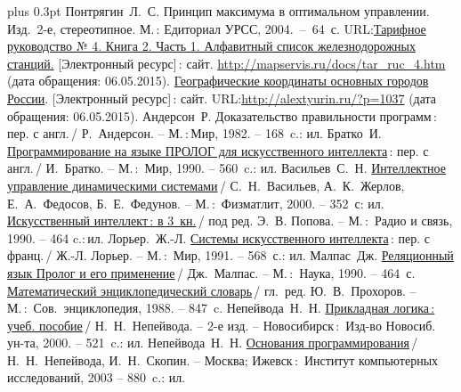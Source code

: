 \documentclass[a4paper,14pt, openany, twoside, final]{extbook} %
\def\emphbib#1{#1}
\begin{document}
\begin{thebibliography}{99}\itemsep1pt \parskip 0pt plus 0.3pt
 Понтрягин~Л.~С. Принцип максимума в оптимальном управлении. Изд.~2-е, стереотипное. М.\,: Едиториал УРСС,  2004.~--~64~с.
 URL:\href{http://mapservis.ru/docs/tar_ruc_4.htm}{Тарифное руководство № 4. Книга 2. Часть 1. Алфавитный список железнодорожных станций.} [Электронный ресурс]\,{}: сайт. \url{http://mapservis.ru/docs/tar_ruc_4.htm} (дата обращения: 06.05.2015).
 \href{http://alextyurin.ru/?p=1037}{Географические координаты основных городов России}. [Электронный ресурс]\,{}: сайт. URL:\url{http://alextyurin.ru/?p=1037} (дата обращения: 06.05.2015).
 Андерсон~Р. \emphbib{Доказательство правильности программ}\,{}: пер. с англ.\,{}/ Р.~Андерсон. -- М.\,:\,Мир, 1982. -- 168~c.: ил.
 Братко~И. \emphbib{\href{http://royallib.ru/book/bratko_ivan/programmirovanie_na_yazike_prolog_dlya_iskusstvennogo_intellekta.html}{Программирование на языке ПРОЛОГ для искусственного интеллекта}}\,{}: пер. с англ.\,/ И.~Братко. -- М.\,:~Мир, 1990. -- 560~c.: ил.
 Васильев~С.~Н. \emphbib{\href{http://bookfi.org/book/616050}{Интеллектное управление динамическими системами}}\,{}/ С.~Н.~Васильев, А.~К.~Жерлов, Е.~А.~Федосов, Б.~Е.~Федунов. -- М.\,:~Физматлит, 2000. -- 352~с: ил.
 \emphbib{\href{http://aihandbook.intsys.org.ru/index.php/intro/ai-handbook}{Искусственный интеллект\,{}: в 3~кн.}}\,{}/ под ред. Э.~В. Попова. -- М.\,:~Радио и связь, 1990. -- 464 c.:\,{}ил.
 Лорьер.~Ж.-Л.  \emphbib{\href{http://publ.lib.ru/ARCHIVES/L/LOR'ER_Jan_Lui/_Lor'er_J.L..html}{Системы искусственного интеллекта}\,{}: пер. с франц.}\,{}/ Ж.-Л. Лорьер. -- М.\,:~Мир, 1991. -- 568~с.: ил.
 Малпас~Дж. \emphbib{\href{http://padaread.com/?book=40731&pg=1}{Реляционный язык Пролог и его применение}}\,{}/ Дж.~Малпас. -- М.\,:~Наука, 1990. -- 464~с.
 \emphbib{\href{https://app.box.com/shared/793ukgvblxmj0hh6btw4}{Математический энциклопедический словарь}}\,{}/ гл.~ред. Ю.~В.~Прохоров. -- М.\,:~Сов.~энциклопедия, 1988. -- 847~c.
 Непейвода~Н.~Н. \emphbib{\href{http://www.logic-books.info/taxonomy/term/215}{Прикладная логика\,{}: учеб. пособие}}\,{}/ Н.~Н.~Непейвода. -- 2-е изд. -- Новосибирск\,{}:~Изд-во Новосиб. ун-та, 2000. -- 521~c.: ил.
 Непейвода~Н.~Н.  \emphbib{\href{http://philosophy.ru/library/logic_math/library/nepeivoda_prog.pdf}{Основания программирования}}\,{}/ Н.~Н.~Непейвода, И.~Н.~Скопин. -- Москва; Ижевск\,{}:~Институт компьютерных исследований, 2003 -- 880~c.: ил.

\end{thebibliography}
\end{document}

